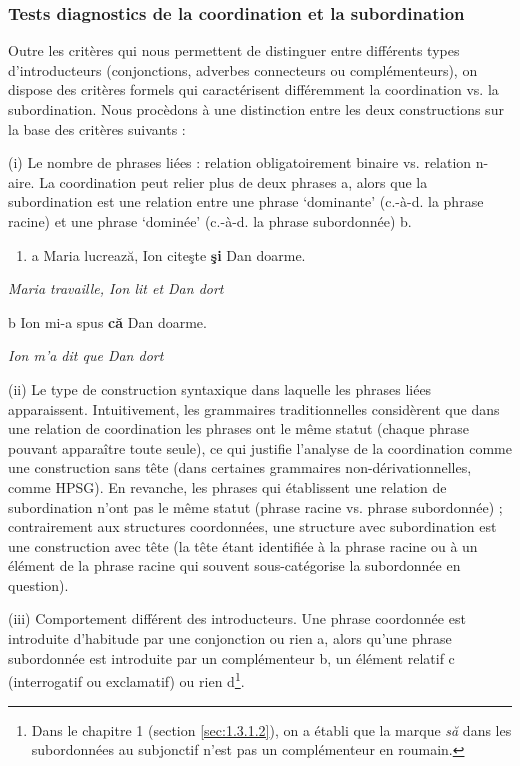 \subsubsection{Tests diagnostics de la coordination et la subordination}
\label{bkm:Ref300868872}Outre les critères qui nous permettent de distinguer entre différents types d'introducteurs (conjonctions, adverbes connecteurs ou complémenteurs), on dispose des critères formels qui caractérisent différemment la coordination vs. la subordination. Nous procèdons à une distinction entre les deux constructions sur la base des critères suivants :

(i) Le nombre de phrases liées : relation obligatoirement binaire vs. relation n-aire. La coordination peut relier plus de deux phrases a, alors que la subordination est une relation entre une phrase `dominante' (c.-à-d. la phrase racine) et une phrase `dominée' (c.-à-d. la phrase subordonnée) b.


\begin{enumerate}
\item \label{bkm:Ref300183728}a  Maria lucrează, Ion citeşte \textbf{şi} Dan doarme.


\end{enumerate}
{\itshape
Maria travaille, Ion lit et Dan dort}

  b  Ion mi-a spus \textbf{că} Dan doarme.

    \textit{Ion m'a dit que Dan dort}

(ii) Le type de construction syntaxique dans laquelle les phrases liées apparaissent. Intuitivement, les grammaires traditionnelles considèrent que dans une relation de coordination les phrases ont le même statut (chaque phrase pouvant apparaître toute seule), ce qui justifie l'analyse de la coordination comme une construction sans tête (dans certaines grammaires non-dérivationnelles, comme HPSG). En revanche, les phrases qui établissent une relation de subordination n'ont pas le même statut (phrase racine vs. phrase subordonnée) ; contrairement aux structures coordonnées, une structure avec subordination est une construction avec tête (la tête étant identifiée à la phrase racine ou à un élément de la phrase racine qui souvent sous-catégorise la subordonnée en question). 

(iii) Comportement différent des introducteurs. Une phrase coordonnée est introduite d'habitude par une conjonction ou rien a, alors qu'une phrase subordonnée est introduite par un complémenteur b, un élément relatif c (interrogatif ou exclamatif) ou rien d\footnote{Dans le chapitre 1 (section \ref{sec:1.3.1.2}), on a établi que la marque \textit{să} dans les subordonnées au subjonctif n'est pas un complémenteur en roumain.}.



